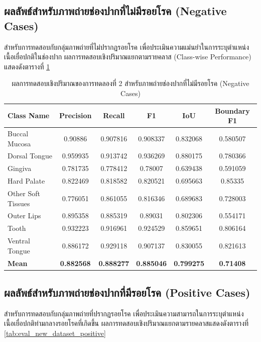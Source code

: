 \subsection{ผลลัพธ์สำหรับภาพถ่ายช่องปากที่ไม่มีรอยโรค (Negative Cases)}
สำหรับการทดสอบกับกลุ่มภาพถ่ายที่ไม่ปรากฏรอยโรค เพื่อประเมินความแม่นยำในการระบุตำแหน่งเนื้อเยื่อปกติในช่องปาก ผลการทดสอบเชิงปริมาณแยกตามรายคลาส (Class-wise Performance) แสดงดังตารางที่ \ref{tab:eval_new_dataset_negative}

\begin{table}[H]
\centering
\caption{ผลการทดสอบเชิงปริมาณของการทดลองที่ 2 สำหรับภาพถ่ายช่องปากที่ไม่มีรอยโรค (Negative Cases)}
\label{tab:eval_new_dataset_negative}
\begin{tabular}{|l|c|c|c|c|c|}
\hline
\textbf{Class Name} & \textbf{Precision} & \textbf{Recall} & \textbf{F1} & \textbf{IoU} & \textbf{Boundary F1} \\ \hline
Buccal Mucosa & 0.90886 & 0.907816 & 0.908337 & 0.832068 & 0.580507 \\
Dorsal Tongue & 0.959935 & 0.913742 & 0.936269 & 0.880175 & 0.780366 \\
Gingiva & 0.781735 & 0.778412 & 0.78007 & 0.639438 & 0.591059 \\
Hard Palate & 0.822469 & 0.818582 & 0.820521 & 0.695663 & 0.85335 \\
Other Soft Tissues & 0.776051 & 0.861055 & 0.816346 & 0.689683 & 0.728003 \\
Outer Lips & 0.895358 & 0.885319 & 0.89031 & 0.802306 & 0.554171 \\
Tooth & 0.932223 & 0.916961 & 0.924529 & 0.859651 & 0.806164 \\
Ventral Tongue & 0.886172 & 0.929118 & 0.907137 & 0.830055 & 0.821613 \\ \hline
\textbf{Mean} & \textbf{0.882568} & \textbf{0.888277} & \textbf{0.885046} & \textbf{0.799275} & \textbf{0.71408} \\ \hline
\end{tabular}
\end{table}

\subsection{ผลลัพธ์สำหรับภาพถ่ายช่องปากที่มีรอยโรค (Positive Cases)}
สำหรับการทดสอบกับกลุ่มภาพถ่ายที่ปรากฏรอยโรค เพื่อประเมินความสามารถในการระบุตำแหน่งเนื้อเยื่อปกติท่ามกลางรอยโรคที่เกิดขึ้น ผลการทดสอบเชิงปริมาณแยกตามรายคลาสแสดงดังตารางที่ \ref{tab:eval_new_dataset_positive}

